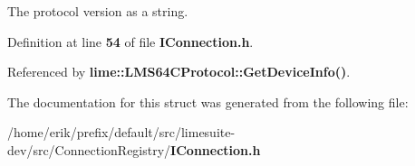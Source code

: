 The protocol version as a string. 



Definition at line {\bf 54} of file {\bf I\+Connection.\+h}.



Referenced by {\bf lime\+::\+L\+M\+S64\+C\+Protocol\+::\+Get\+Device\+Info()}.



The documentation for this struct was generated from the following file\+:\begin{DoxyCompactItemize}
\item 
/home/erik/prefix/default/src/limesuite-\/dev/src/\+Connection\+Registry/{\bf I\+Connection.\+h}\end{DoxyCompactItemize}
